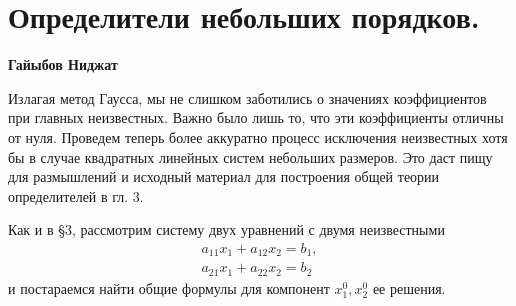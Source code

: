 \section{Определители небольших порядков.}
{\vskip 4mm
\centerline{\bf Гайыбов Ниджат} \vskip 1cm
 Излагая метод Гаусса, мы не слишком заботились о значениях коэффициентов при главных неизвестных. Важно было лишь то, что эти коэффициенты отличны от нуля. Проведем теперь более аккуратно процесс исключения неизвестных хотя бы в случае квадратных линейных систем небольших размеров. Это даст пищу для размышлений и исходный материал для построения общей теории определителей в гл. 3.


Как и в \S3, рассмотрим систему двух уравнений с двумя неизвестными 
\begin{equation}
\label{f1}
\begin{matrix}
a_{11}x_{1}+a_{12}x_{2}=b_{1}, \\
a_{21}x_{1}+a_{22}x_{2}=b_{2} 
\end{matrix}
\end{equation}
  и постараемся найти общие формулы для компонент $x_1^0,x_2^0$ ее решения.


}
